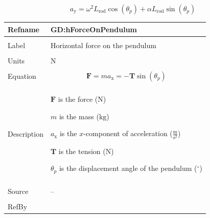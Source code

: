 \documentclass[12pt]{article}
\begin{document}
\begin{displaymath}
{a_{\text{y}}}=ω^{2} {L_{\text{rod}}} \cos\left({θ_{p}}\right)+α {L_{\text{rod}}} \sin\left({θ_{p}}\right)
\end{displaymath}
\vspace{\baselineskip}
\noindent
\begin{minipage}{\textwidth}
\begin{tabular}{>{\raggedright}p{}>{\raggedright\arraybackslash}p{}}
\toprule \textbf{Refname} & \textbf{GD:hForceOnPendulum}
\label{GD:hForceOnPendulum}
\\ \midrule \\
Label & Horizontal force on the pendulum
        
\\ \midrule \\
Units & ${\text{N}}$
        
\\ \midrule \\
Equation & \begin{displaymath}
           \symbf{F}=m {a_{\text{x}}}=-\symbf{T} \sin\left({θ_{p}}\right)
           \end{displaymath}
\\ \midrule \\
Description & \begin{symbDescription}
              \item{$\symbf{F}$ is the force (${\text{N}}$)}
              \item{$m$ is the mass (${\text{kg}}$)}
              \item{${a_{\text{x}}}$ is the $x$-component of acceleration ($\frac{\text{m}}{\text{s}^{2}}$)}
              \item{$\symbf{T}$ is the tension (${\text{N}}$)}
              \item{${θ_{p}}$ is the displacement angle of the pendulum (${{}^{\circ}}$)}
              \end{symbDescription}
\\ \midrule \\
Source & --
         
\\ \midrule \\
RefBy & 
\\ \bottomrule
\end{tabular}
\end{minipage}
\end{document}
